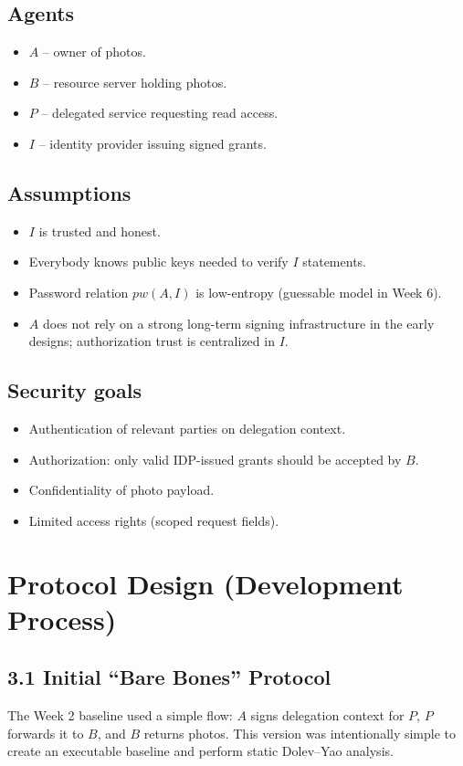 \documentclass[11pt,a4paper]{article}
\begin{document}
\subsection*{Agents}
\begin{itemize}
  \item \textbf{$A$} -- owner of photos.
  \item \textbf{$B$} -- resource server holding photos.
  \item \textbf{$P$} -- delegated service requesting read access.
  \item \textbf{$I$} -- identity provider issuing signed grants.
\end{itemize}

\subsection*{Assumptions}
\begin{itemize}
  \item $I$ is trusted and honest.
  \item Everybody knows public keys needed to verify $I$ statements.
  \item Password relation $pw(A,I)$ is low-entropy (guessable model in Week 6).
  \item $A$ does not rely on a strong long-term signing infrastructure in the early designs; authorization trust is centralized in $I$.
\end{itemize}

\subsection*{Security goals}
\begin{itemize}
  \item Authentication of relevant parties on delegation context.
  \item Authorization: only valid IDP-issued grants should be accepted by $B$.
  \item Confidentiality of photo payload.
  \item Limited access rights (scoped request fields).
\end{itemize}

\section{Protocol Design (Development Process)}

\subsection{3.1 Initial ``Bare Bones'' Protocol}
The Week 2 baseline used a simple flow:
$A$ signs delegation context for $P$, $P$ forwards it to $B$, and $B$ returns photos.
This version was intentionally simple to create an executable baseline and perform static Dolev--Yao analysis.
\end{document}
